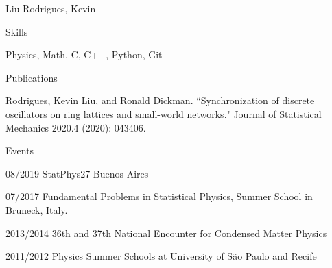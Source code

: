 \documentclass[12pt,a4paper]{article}
\begin{document}
\begin{cv}{Liu Rodrigues, Kevin}
  \begin{cvlist}{Skills}
  \item[] Physics, Math, C, C++, Python, Git
  \end{cvlist}

  \begin{cvlist}{Publications}
  \item[] Rodrigues, Kevin Liu, and Ronald Dickman. ``Synchronization of discrete oscillators on ring lattices and small-world networks." Journal of Statistical Mechanics 2020.4 (2020): 043406.
  \end{cvlist}

  \begin{cvlist}{Events}
  \item[08/2019] StatPhys27 Buenos Aires
  \item[07/2017] Fundamental Problems in Statistical Physics, Summer School in Bruneck, Italy.
  \item[2013/2014] 36th and 37th National Encounter for Condensed Matter Physics 
  \item[2011/2012] Physics Summer Schools at University of São Paulo and Recife
  \end{cvlist}

\end{cv}
\end{document}
